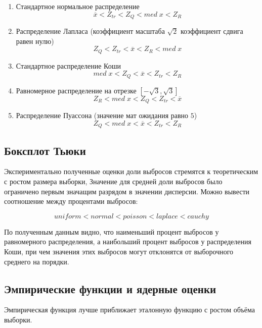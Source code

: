 \documentclass[a4]{article}
\begin{document}
\begin{enumerate}
	\item Стандартное нормальное распределение $$\overline{x} < Z_{tr} < Z_Q < med\;x < Z_R$$
	
	\item Распределение Лапласа (коэффициент масштаба $\sqrt{2}$ коэффициент сдвига равен нулю) $$Z_Q < Z_{tr} < \overline{x} <  Z_R <med\;x$$
	
	\item Стандартное распределение Коши $$med\;x < Z_Q <  \overline{x} < Z_{tr} < Z_R$$
	
	\item Равномерное распределение на отрезке $\left[-\sqrt{3},\sqrt{3}\right]$ $$Z_R < med\;x < Z_Q < Z_{tr} < \overline{x}$$
	
	\item Распределение Пуассона (значение мат ожидания равно $5$) $$Z_Q < med\;x < \overline{x} < Z_{tr} < Z_R$$
	
\end{enumerate}

\subsection{Боксплот Тьюки}
\par Экспериментально полученные оценки доли выбросов стремятся к теоретическим с ростом размера выборки, Значение для средней доли выбросов было ограничено первым значащим разрядом в значении дисперсии.
Можно вывести соотношение между процентами выбросов:

\begin{equation}
uniform<normal<poisson<laplace<cauchy
\end{equation}

\par По полученным данным видно, что наименьший процент выбросов у равномерного распределения, а наибольший процент выбросов у распределения Коши, при чем значения этих выбросов могут отклонятся от выборочного среднего на порядки.

\subsection{Эмпирические функции и ядерные оценки}
\par Эмпирическая функция лучше приближает эталонную функцию с ростом объёма выборки.
\end{document}
